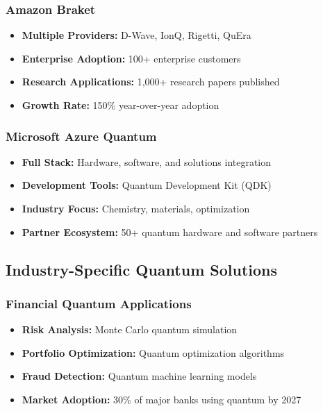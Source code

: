 \documentclass[12pt,a4paper]{article}
\begin{document}
\subsubsection{Amazon Braket}
\begin{itemize}
    \item \textbf{Multiple Providers:} D-Wave, IonQ, Rigetti, QuEra
    \item \textbf{Enterprise Adoption:} 100+ enterprise customers
    \item \textbf{Research Applications:} 1,000+ research papers published
    \item \textbf{Growth Rate:} 150\% year-over-year adoption
\end{itemize}

\subsubsection{Microsoft Azure Quantum}
\begin{itemize}
    \item \textbf{Full Stack:} Hardware, software, and solutions integration
    \item \textbf{Development Tools:} Quantum Development Kit (QDK)
    \item \textbf{Industry Focus:} Chemistry, materials, optimization
    \item \textbf{Partner Ecosystem:} 50+ quantum hardware and software partners
\end{itemize}

\subsection{Industry-Specific Quantum Solutions}

\subsubsection{Financial Quantum Applications}
\begin{itemize}
    \item \textbf{Risk Analysis:} Monte Carlo quantum simulation
    \item \textbf{Portfolio Optimization:} Quantum optimization algorithms
    \item \textbf{Fraud Detection:} Quantum machine learning models
    \item \textbf{Market Adoption:} 30\% of major banks using quantum by 2027
\end{itemize}
\end{document}
